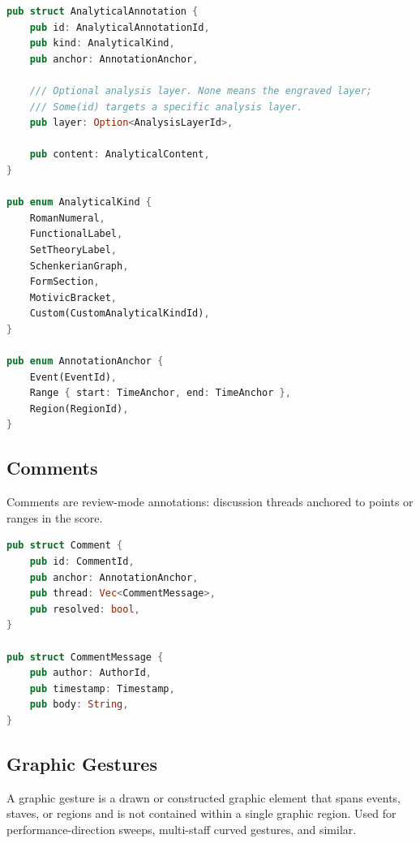 \documentclass[11pt,letterpaper]{report}
\begin{document}
\begin{lstlisting}[language=Rust]
pub struct AnalyticalAnnotation {
    pub id: AnalyticalAnnotationId,
    pub kind: AnalyticalKind,
    pub anchor: AnnotationAnchor,

    /// Optional analysis layer. None means the engraved layer;
    /// Some(id) targets a specific analysis layer.
    pub layer: Option<AnalysisLayerId>,

    pub content: AnalyticalContent,
}

pub enum AnalyticalKind {
    RomanNumeral,
    FunctionalLabel,
    SetTheoryLabel,
    SchenkerianGraph,
    FormSection,
    MotivicBracket,
    Custom(CustomAnalyticalKindId),
}

pub enum AnnotationAnchor {
    Event(EventId),
    Range { start: TimeAnchor, end: TimeAnchor },
    Region(RegionId),
}
\end{lstlisting}

\subsection{Comments}

Comments are review-mode annotations: discussion threads anchored to
points or ranges in the score.

\begin{lstlisting}[language=Rust]
pub struct Comment {
    pub id: CommentId,
    pub anchor: AnnotationAnchor,
    pub thread: Vec<CommentMessage>,
    pub resolved: bool,
}

pub struct CommentMessage {
    pub author: AuthorId,
    pub timestamp: Timestamp,
    pub body: String,
}
\end{lstlisting}

\subsection{Graphic Gestures}

A graphic gesture is a drawn or constructed graphic element that
spans events, staves, or regions and is not contained within a single
graphic region. Used for performance-direction sweeps,
multi-staff curved gestures, and similar.
\end{document}
